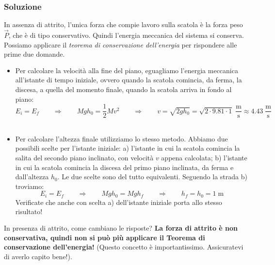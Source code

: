\documentclass[12pt,a4paper]{book}
\begin{document}
\subsubsection*{Soluzione}
In assenza di attrito, l'unica forza che compie lavoro sulla scatola è la forza peso $\vec{P}$, che è di tipo conservativo. Quindi l'energia meccanica del sistema si conserva. Possiamo applicare il \textit{teorema di conservazione dell'energia} per rispondere alle prime due domande.
\begin{itemize}
\item  Per calcolare la velocità alla fine del piano, eguagliamo l'energia meccanica all'istante di tempo iniziale, ovvero quando la scatola comincia, da ferma, la discesa, a quella del momento finale, quando la scatola arriva in fondo al piano:
\begin{equation*}
E_{i}=E_{f} \qquad  \Rightarrow \qquad   Mgh_0 = \frac{1}{2}M v^2 \qquad  \Rightarrow \qquad v=\sqrt{2gh_0}= \sqrt{2\cdot 9.81 \cdot 1} \;\frac{\text{m}}{\text{s}} \approx 4.43 \; \frac{\text{m}}{\text{s}}
\end{equation*}\\

\item Per calcolare l'altezza finale utilizziamo lo stesso metodo. Abbiamo due possibili scelte per l'istante iniziale: 
a) l'istante in cui la scatola comincia la salita del secondo piano inclinato, con velocità $v$ appena calcolata; b) l'istante in cui la scatola comincia la discesa del primo piano inclinata, da ferma e dall'altezza $h_0$. 
Le due scelte sono del tutto equivalenti. Seguendo la strada b) troviamo:
\begin{equation*}
E_{i}=E_{f} \qquad  \Rightarrow \qquad   Mgh_0 = Mg h_{f} \qquad  \Rightarrow \qquad    h_{f}=h_0= 1\; \text{m}
\end{equation*}
Verificate che anche con scelta a) dell'istante iniziale porta allo stesso risultato!
\end{itemize}


In presenza di attrito, come cambiano le risposte? \textbf{La forza di attrito è non conservativa, quindi non si può più applicare il Teorema di conservazione dell'energia!} (Questo concetto è importantissimo. Assicuratevi di averlo capito bene!). \\
\end{document}
